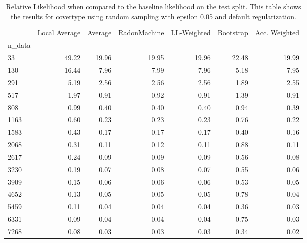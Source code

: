 \begin{table}
\centering
\caption{Relative Likelihood when compared to the baseline likelihood on the test split. This table shows the results for  covertype using  random sampling with epsilon  0.05 and  default regularization.}
\label{tab:11}
\begin{tabular}{lrrrrrr}
\toprule
{} &  Local Average &  Average &  RadonMachine &  LL-Weighted &  Bootstrap &  Acc. Weighted \\
n\_data &                &          &               &              &            &                \\
\midrule
33     &          49.22 &    19.96 &         19.95 &        19.96 &      22.48 &          19.99 \\
130    &          16.44 &     7.96 &          7.99 &         7.96 &       5.18 &           7.95 \\
291    &           5.19 &     2.56 &          2.56 &         2.56 &       1.89 &           2.55 \\
517    &           1.97 &     0.91 &          0.92 &         0.91 &       1.39 &           0.91 \\
808    &           0.99 &     0.40 &          0.40 &         0.40 &       0.94 &           0.39 \\
1163   &           0.60 &     0.23 &          0.23 &         0.23 &       0.76 &           0.22 \\
1583   &           0.43 &     0.17 &          0.17 &         0.17 &       0.40 &           0.16 \\
2068   &           0.31 &     0.11 &          0.12 &         0.11 &       0.88 &           0.11 \\
2617   &           0.24 &     0.09 &          0.09 &         0.09 &       0.56 &           0.08 \\
3230   &           0.19 &     0.07 &          0.08 &         0.07 &       0.55 &           0.06 \\
3909   &           0.15 &     0.06 &          0.06 &         0.06 &       0.53 &           0.05 \\
4652   &           0.13 &     0.05 &          0.05 &         0.05 &       0.78 &           0.04 \\
5459   &           0.11 &     0.04 &          0.04 &         0.04 &       0.36 &           0.03 \\
6331   &           0.09 &     0.04 &          0.04 &         0.04 &       0.75 &           0.03 \\
7268   &           0.08 &     0.03 &          0.03 &         0.03 &       0.34 &           0.02 \\
\bottomrule
\end{tabular}
\end{table}
